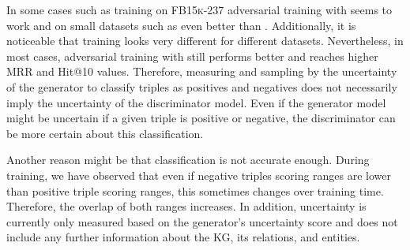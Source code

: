

In some cases such as training on \textsc{FB15k-237} adversarial training with \ussoftmax seems to work and on small datasets such as \umls even better than \origsampling.
Additionally, it is noticeable that training looks very different for different datasets.
Nevertheless, in most cases, adversarial training with \origsampling still performs better and reaches higher MRR and Hit@10 values.
Therefore, measuring and sampling by the uncertainty of the generator to classify triples as positives and negatives does not necessarily imply the uncertainty of the discriminator model.
Even if the generator model might be uncertain if a given triple is positive or negative, the discriminator can be more certain about this classification.
\clearpage



Another reason might be that classification is not accurate enough.
During training, we have observed that even if negative triples scoring ranges are lower than positive triple scoring ranges, this sometimes changes over training time.
Therefore, the overlap of both ranges increases.
In addition, uncertainty is currently only measured based on the generator's uncertainty score and does not include any further information about the \ac{KG}, its relations, and entities.
\clearpage




